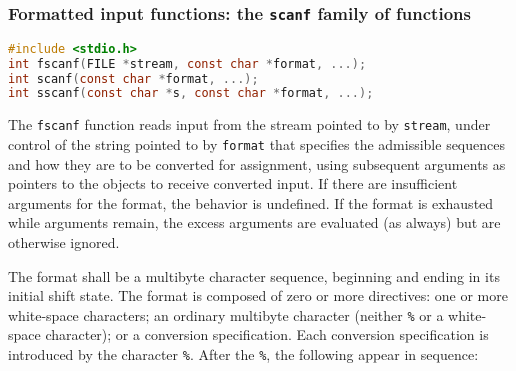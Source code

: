 \subsubsection{Formatted input functions: the \texttt{scanf} family of functions}
\lstset{basicstyle=\scriptsize, numbers=left, captionpos=b, tabsize=4}
\begin{lstlisting}[caption=Section \thesection listing \arabic{filecnt},language={C},
breaklines=true,xleftmargin=15pt,label=lst:section\thesection listing\arabic{filecnt}]
#include <stdio.h>
int fscanf(FILE *stream, const char *format, ...);
int scanf(const char *format, ...);
int sscanf(const char *s, const char *format, ...);
\end{lstlisting}

The \texttt{fscanf} function reads input from the stream pointed to by
\texttt{stream}, under control of the string pointed to by \texttt{format} that
specifies the admissible sequences and how they are to be converted for
assignment, using subsequent arguments as pointers to the objects to receive
converted input. If there are insufficient arguments for the format, the
behavior is undefined. If the format is exhausted while arguments remain, the
excess arguments are evaluated (as always) but are otherwise ignored.

The format shall be a multibyte character sequence, beginning and ending in its
initial shift state. The format is composed of zero or more directives: one or
more white-space characters; an ordinary multibyte character (neither
\texttt{\%} or a white-space character); or a conversion specification. Each
conversion specification is introduced by the character \texttt{\%}. After the
\texttt{\%}, the following appear in sequence:

